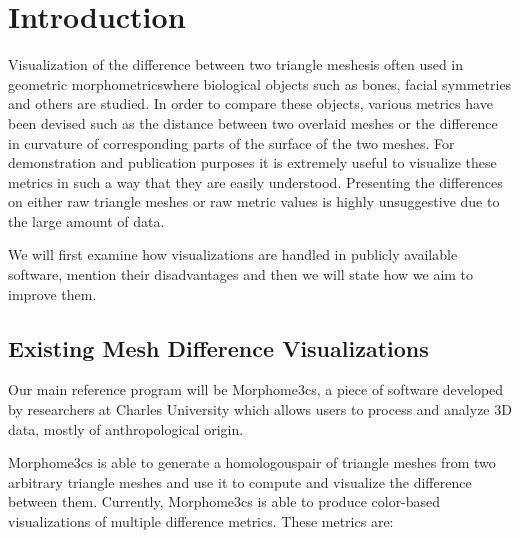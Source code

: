 \chapter*{Introduction}

Visualization of the difference between two triangle meshes\footnotemark is often used in geometric morphometrics\footnotemark where biological objects such as bones, facial symmetries and others are studied. In order to compare these objects, various metrics have been devised such as the distance between two overlaid meshes or the difference in curvature of corresponding parts of the surface of the two meshes. For demonstration and publication purposes it is extremely useful to visualize these metrics in such a way that they are easily understood. Presenting the differences on either raw triangle meshes or raw metric values is highly unsuggestive due to the large amount of data\footnotemark.

\addtocounter{footnote}{-3}

We will first examine how visualizations are handled in publicly available software, mention their disadvantages and then we will state how we aim to improve them.

\section*{Existing Mesh Difference Visualizations}

Our main reference program will be Morphome3cs\footnotemark, a piece of software developed by researchers at Charles University which allows users to process and analyze 3D data, mostly of anthropological origin.


Morphome3cs is able to generate a homologous\footnotemark pair of triangle meshes from two arbitrary triangle meshes and use it to compute and visualize the difference between them. Currently, Morphome3cs is able to produce color-based visualizations of multiple difference metrics. These metrics are:

